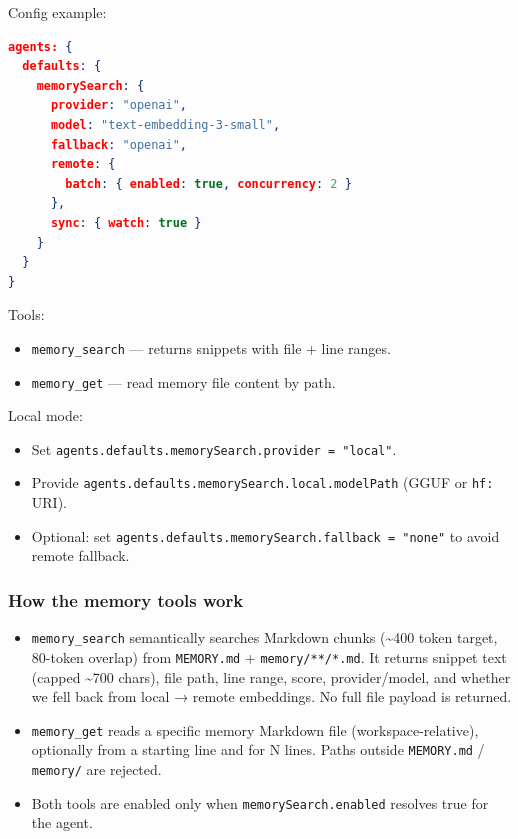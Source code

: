 Config example:

\begin{lstlisting}[language=json]
agents: {
  defaults: {
    memorySearch: {
      provider: "openai",
      model: "text-embedding-3-small",
      fallback: "openai",
      remote: {
        batch: { enabled: true, concurrency: 2 }
      },
      sync: { watch: true }
    }
  }
}
\end{lstlisting}


Tools:

\begin{itemize}
  \item \texttt{memory\_search} — returns snippets with file + line ranges.
  \item \texttt{memory\_get} — read memory file content by path.
\end{itemize}


Local mode:

\begin{itemize}
  \item Set \texttt{agents.defaults.memorySearch.provider = "local"}.
  \item Provide \texttt{agents.defaults.memorySearch.local.modelPath} (GGUF or \texttt{hf:} URI).
  \item Optional: set \texttt{agents.defaults.memorySearch.fallback = "none"} to avoid remote fallback.
\end{itemize}


\subsubsection{How the memory tools work}


\begin{itemize}
  \item \texttt{memory\_search} semantically searches Markdown chunks (\textasciitilde{}400 token target, 80-token overlap) from \texttt{MEMORY.md} + \texttt{memory/**/*.md}. It returns snippet text (capped \textasciitilde{}700 chars), file path, line range, score, provider/model, and whether we fell back from local → remote embeddings. No full file payload is returned.
  \item \texttt{memory\_get} reads a specific memory Markdown file (workspace-relative), optionally from a starting line and for N lines. Paths outside \texttt{MEMORY.md} / \texttt{memory/} are rejected.
  \item Both tools are enabled only when \texttt{memorySearch.enabled} resolves true for the agent.
\end{itemize}


